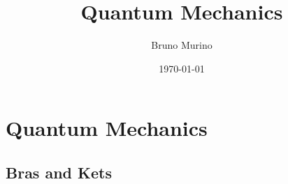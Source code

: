 \documentclass[oneside, 10pt, notitlepage]{book}
\title{Quantum Mechanics} %
\author{Bruno Murino} %
\date{\today} %
\begin{document}

\dominitoc
\faketableofcontents

\part{Quantum Mechanics}
\chapter{Bras and Kets}
\minitoc








%
%
%
































\end{document}
